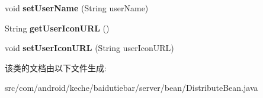 \begin{DoxyCompactItemize}
void {\bfseries set\+User\+Name} (String user\+Name)
\item 
\mbox{\label{classcom_1_1android_1_1keche_1_1baidutiebar_1_1server_1_1bean_1_1_distribute_bean_aead56d21c609e3b1f3219458abbb4f82}} 
String {\bfseries get\+User\+Icon\+U\+RL} ()
\item 
\mbox{\label{classcom_1_1android_1_1keche_1_1baidutiebar_1_1server_1_1bean_1_1_distribute_bean_a72fbb4e06599f3399802184e705d2398}} 
void {\bfseries set\+User\+Icon\+U\+RL} (String user\+Icon\+U\+RL)
\end{DoxyCompactItemize}


该类的文档由以下文件生成\+:\begin{DoxyCompactItemize}
\item 
src/com/android/keche/baidutiebar/server/bean/Distribute\+Bean.\+java\end{DoxyCompactItemize}

